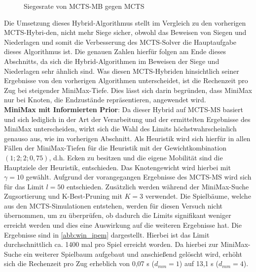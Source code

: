 \documentclass[12pt,a4paper,bibliography=totocnumbered,listof=totocnumbered]{article}
\begin{document}
\begin{figure} [h]
\centering
{}
\caption{Siegesrate von MCTS-MB gegen MCTS}
\label{abb:win_mb}
\end{figure}
Die Umsetzung dieses Hybrid-Algorithmus stellt im Vergleich zu den vorherigen MCTS-Hybri-den, nicht mehr Siege sicher, obwohl das Beweisen von Siegen und Niederlagen und somit die Verbesserung des MCTS-Solver die Hauptaufgabe dieses Algorithmus ist. Die genauen Zahlen hierfür folgen am Ende dieses Abschnitts, da sich die Hybrid-Algorithmen im Beweisen der Siege und Niederlagen sehr ähnlich sind. Was diesen MCTS-Hybriden hinsichtlich seiner Ergebnisse von den vorherigen Algorithmen unterscheidet, ist die Rechenzeit pro Zug bei steigender MiniMax-Tiefe. Dies lässt sich darin begründen, dass MiniMax nur bei Knoten, die Endzustände repräsentieren, angewendet wird.\\
\textbf{MiniMax mit Informierten Prior}: Da dieser Hybrid auf MCTS-MS basiert und sich lediglich in der Art der Verarbeitung und der ermittelten Ergebnisse des MiniMax unterscheiden, wirkt sich die Wahl des Limits höchstwahrscheinlich genauso aus, wie im vorherigen Abschnitt. 
Als Heuristik wird sich hierfür in allen Fällen der MiniMax-Tiefen für die Heuristik mit der Gewichtkombination $(1;2;2;0,75)$, d.h. Ecken zu besitzen und die eigene Mobilität sind die Hauptziele der Heuristik, entschieden. Das Knotengewicht wird hierbei mit $\gamma = 10$ gewählt. Aufgrund der vorangegangen Ergebnisse des MCTS-MS wird sich für das Limit $l=50$ entschieden. Zusätzlich werden während der MiniMax-Suche Zugsortierung und K-Best-Pruning mit $K = 3$ verwendet. Die Spielbäume, welche aus den MCTS-Simulationen entstehen, werden für diesen Versuch nicht übernommen, um zu überprüfen, ob dadurch die Limits signifikant weniger erreicht werden und dies eine Auswirkung auf die weiteren Ergebnisse hat. Die Ergebnisse sind in \autoref{abb:win_ipem} dargestellt. Hierbei ist das Limit durchschnittlich ca. 1400 mal pro Spiel erreicht worden. Da hierbei zur MiniMax-Suche ein weiterer Spielbaum aufgebaut und anschießend gelöscht wird, erhöht sich die Rechenzeit pro Zug erheblich von 0,07 s ($d_{mm}=1$) auf 13,1 s ($d_{mm}=4$). 
\end{document}
